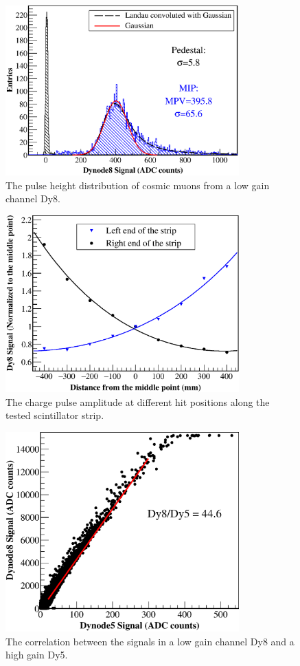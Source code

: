 \documentclass[5p, times]{elsarticle}
\begin{document}
\begin{figure}
	\centering
	\includegraphics[width=90mm]{mip}
	\caption{The pulse height distribution of cosmic muons from a low gain channel Dy8.}
	\label{fig:mip}
\end{figure} 

\begin{figure}
	\centering
	\includegraphics[width=90mm]{attenuation}
	\caption{The charge pulse amplitude at different hit positions along the tested scintillator strip.}
	\label{fig:attenuation}
\end{figure} 

\begin{figure}
	\centering
	\includegraphics[width=90mm]{dy58}
	\caption{The correlation between the signals in a low gain channel Dy8 and a high gain Dy5.}
	\label{fig:dy58}
\end{figure} 
\end{document}
